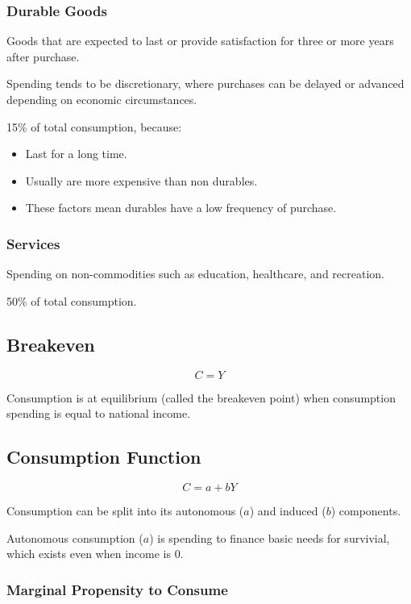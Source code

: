 \documentclass[a4paper,11pt]{report}
\begin{document}
\subsubsection{Durable Goods}

Goods that are expected to last or provide satisfaction for three or more
years after purchase.

Spending tends to be discretionary, where purchases can be delayed or advanced
depending on economic circumstances.

15\% of total consumption, because:

\begin{itemize}
\item Last for a long time.
\item Usually are more expensive than non durables.
\item These factors mean durables have a low frequency of purchase.
\end{itemize}

\subsubsection{Services}

Spending on non-commodities such as education, healthcare, and recreation.

50\% of total consumption.

\subsection{Breakeven}

$$
C = Y
$$

Consumption is at equilibrium (called the breakeven point) when consumption
spending is equal to national income.

\subsection{Consumption Function}

$$
C = a + bY
$$

Consumption can be split into its autonomous ($a$) and induced ($b$) components.

Autonomous consumption ($a$) is spending to finance basic needs for survivial,
which exists even when income is 0.

\subsubsection{Marginal Propensity to Consume}
\end{document}
